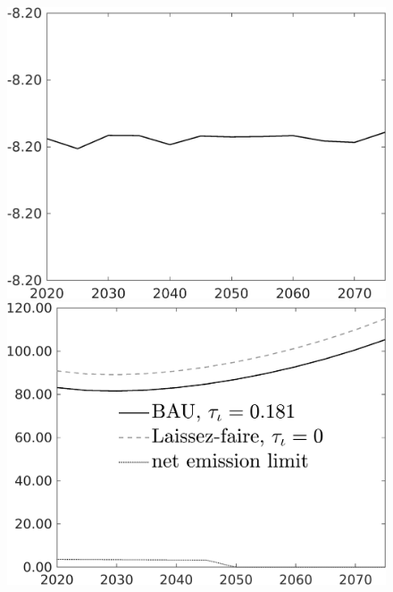 \begin{figure}[h!!]
\begin{minipage}[]{0.32\textwidth}
	\end{minipage}	
	\begin{minipage}[]{0.32\textwidth}
		\includegraphics[width=1\textwidth]{../../codding_model/own_basedOnFried/optimalPol_010922_revision/figures/all_13Sept22/CompTaul_Equlab_LFBAUPer_Reg0_C_spillover0_nsk1_xgr1_knspil0_sep1_countec0_GovRev0_etaa0.79.png}
	\end{minipage}	
	\begin{minipage}[]{0.32\textwidth}
	\includegraphics[width=1\textwidth]{../../codding_model/own_basedOnFried/optimalPol_010922_revision/figures/all_13Sept22/CompTaul_Equlab_LFBAU_Reg0_Emnet_spillover0_nsk1_xgr1_knspil0_sep1_countec0_GovRev0_etaa0.79_lgd1.png}

\end{minipage}
\end{figure}
